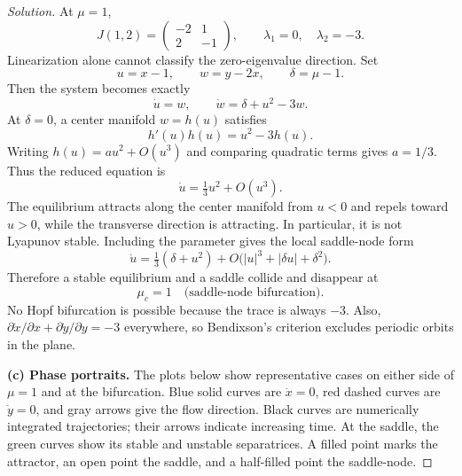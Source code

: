 \documentclass[10pt]{amsart}
\newenvironment{solution}
{\begin{proof}[Solution]}
{\end{proof}}
\begin{document}
\begin{onehalfspace}
\begin{solution}
At $\mu=1$,
\[
    J(1,2)=\begin{pmatrix}-2&1\\2&-1\end{pmatrix},
    \qquad \lambda_1=0,\quad\lambda_2=-3.
\]
Linearization alone cannot classify the zero-eigenvalue direction. Set
\[
    u=x-1,\qquad w=y-2x,\qquad \delta=\mu-1.
\]
Then the system becomes exactly
\[
    \dot{u}=w,\qquad \dot{w}=\delta+u^2-3w.
\]
At $\delta=0$, a center manifold $w=h(u)$ satisfies
\[
    h'(u)h(u)=u^2-3h(u).
\]
Writing $h(u)=a u^2+O(u^3)$ and comparing quadratic terms gives $a=1/3$. Thus the reduced equation is
\[
    \dot{u}=\tfrac13u^2+O(u^3).
\]
The equilibrium attracts along the center manifold from $u<0$ and repels toward $u>0$, while the transverse direction is attracting. In particular, it is not Lyapunov stable. Including the parameter gives the local saddle-node form
\[
    \dot{u}=\tfrac13(\delta+u^2)
       +O\bigl(|u|^3+|\delta u|+\delta^2\bigr).
\]
Therefore a stable equilibrium and a saddle collide and disappear at
\[
    \mu_c=1\quad\text{(saddle-node bifurcation).}
\]
No Hopf bifurcation is possible because the trace is always $-3$. Also,
$\partial\dot{x}/\partial x+\partial\dot{y}/\partial y=-3$ everywhere, so Bendixson's criterion excludes periodic orbits in the plane.

\begin{center}
\end{center}

\textbf{(c) Phase portraits.} The plots below show representative cases on either side of $\mu=1$ and at the bifurcation. Blue solid curves are $\dot{x}=0$, red dashed curves are $\dot{y}=0$, and gray arrows give the flow direction. Black curves are numerically integrated trajectories; their arrows indicate increasing time. At the saddle, the green curves show its stable and unstable separatrices. A filled point marks the attractor, an open point the saddle, and a half-filled point the saddle-node.


\end{solution}
\end{onehalfspace}
\end{document}

